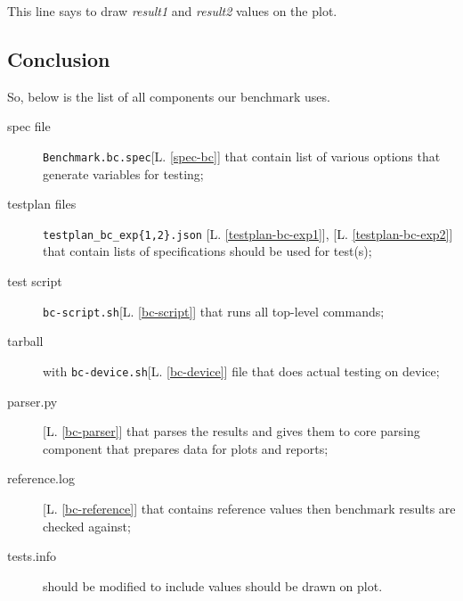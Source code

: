 This line says to draw \textit{result1} and \textit{result2} values on the plot.

\subsection{Conclusion}
\label{sec:conslusion}

So, below is the list of all components our benchmark uses.

\begin{description}

\item[spec file] \texttt{Benchmark.bc.spec}[L. \ref{spec-bc}] that contain list of various options that generate variables for testing;
\item[testplan files] \texttt{testplan\_bc\_exp\{1,2\}.json} [L. \ref{testplan-bc-exp1}], [L. \ref{testplan-bc-exp2}] that contain lists of specifications should be used for test(s);
\item[test script] \texttt{bc-script.sh}[L. \ref{bc-script}] that runs all top-level commands;
\item[tarball] with \texttt{bc-device.sh}[L. \ref{bc-device}] file that does actual testing on device;
\item[parser.py] [L. \ref{bc-parser}] that parses the results and gives them to core parsing component that prepares data for plots and reports;
\item[reference.log] [L. \ref{bc-reference}] that contains reference values then benchmark results are checked against;
\item[tests.info] should be modified to include values should be drawn on plot.

\end{description}

